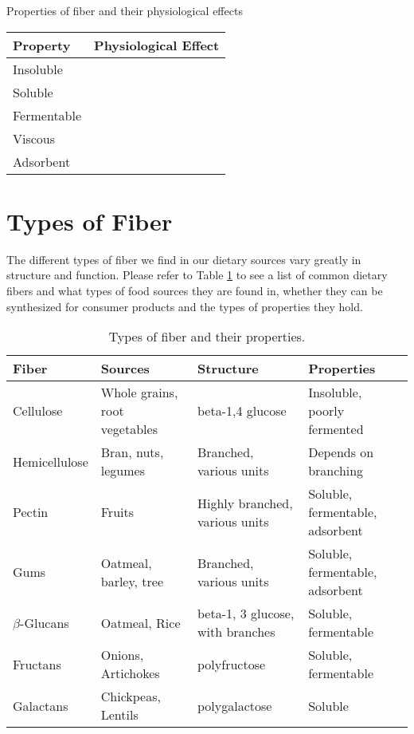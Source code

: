 \documentclass{tufte-handout}
\begin{document}
\begin{margintable}
\caption{Properties of fiber and their physiological effects}
\label{tab:fiber-effects}
\begin{tabular}{ll}
\hline
\textbf{Property} & \textbf{Physiological Effect} \\ \hline
Insoluble &  \\
Soluble &  \\
Fermentable &  \\
Viscous &  \\
Adsorbent &  \\ \bottomrule
\end{tabular}
\end{margintable}

\section{Types of Fiber}
The different types of fiber we find in our dietary sources vary greatly in structure and function. Please refer to Table \ref{tab:fiber-types} to see a list of common dietary fibers and what types of food sources they are found in, whether they can be synthesized for consumer products and the types of properties they hold.

\begin{table}[t]
\caption{Types of fiber and their properties.}
\label{tab:fiber-types}
\begin{tabular}{p{2cm}p{3cm}p{2cm}p{3cm}}
\toprule
\textbf{Fiber} & \textbf{Sources} & \textbf{Structure} & \textbf{Properties} \\ \midrule
Cellulose & Whole grains, root vegetables & beta-1,4 glucose & Insoluble, poorly fermented \\
Hemicellulose & Bran, nuts, legumes & Branched, various units & Depends on branching \\
Pectin & Fruits & Highly branched, various units & Soluble, fermentable, adsorbent \\
Gums & Oatmeal, barley, tree & Branched, various units & Soluble, fermentable, adsorbent \\
$\beta$-Glucans & Oatmeal, Rice & beta-1, 3 glucose, with branches & Soluble, fermentable \\
Fructans & Onions, Artichokes & polyfructose & Soluble, fermentable \\ 
Galactans & Chickpeas, Lentils & polygalactose & Soluble \\ \bottomrule
\end{tabular}
\end{table}





\end{document}
